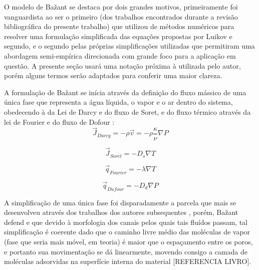     O modelo de Ba\v{z}ant se destaca por dois grandes motivos, primeiramente foi
    vanguardista ao ser o primeiro (dos trabalhos encontrados durante a revisão
    bibliográfica do presente trabalho) que utilizou de métodos numéricos para
    resolver uma formulação simplificada das equações propostas por Luikov e
    segundo, e o segundo pelas próprias simplificações utilizadas que permitiram
    uma abordagem semi-empírica direcionada com grande foco para a aplicação em
    questão. A presente seção usará uma notação próxima à utilizada pelo autor,
    porém alguns termos serão adaptados para conferir uma maior clareza.

    A formulação de Ba\v{z}ant se inícia através da definição do fluxo mássico
    de uma única fase que representa a água líquida, o vapor e o ar dentro do
    sistema, obedecendo à da Lei de Darcy e do fluxo de Soret, e do fluxo térmico através da
    lei de Fourier e do fluxo de Dofour \cite{bazant1978thermal, bazant1978, bavzant1982, bazant1979}:
    \begin{equation}
      \label{eq:Darcy}
      \vec{J}_{Darcy} = - \rho \vec{v} = - \rho \frac{\kappa }{\nu} \nabla P 
    \end{equation}

    \begin{equation}
      \label{eq:Soret}
      \vec{J}_{Soret} = - D_s \nabla T
    \end{equation}

    \begin{equation}
      \label{eq:Fourier}
     \vec{q}_{Fourier} = - \lambda \nabla T 
    \end{equation}

    \begin{equation}
      \label{eq:Dufour}
      \vec{q}_{Dufour} = - D_d \nabla P
    \end{equation}

    A simplificação de uma única fase foi disparadamente a parcela que mais se
    desenvolveu através dos trabalhos dos autores
    subsequentes \cite{Pesavento2013, Gong1995a, Gong1991, Gawin2003, Gawin2004,
      Gawin1999, Fey2016b, Davie2006a, Davie2012a, Abdel-Rahman1996}, porém,
    Ba\v{z}ant defend e que devido à morfologia dos canais pelos quais tais fluídos passam, tal simplificação é coerente dado que o caminho livre médio das moléculas de vapor (fase que seria mais móvel, em teoria) é maior que o espaçamento entre os poros, e portanto sua
    movimentação se dá linearmente, movendo consigo a camada de moléculas
    adsorvidas na superfície interna do material [REFERENCIA LIVRO].
    
